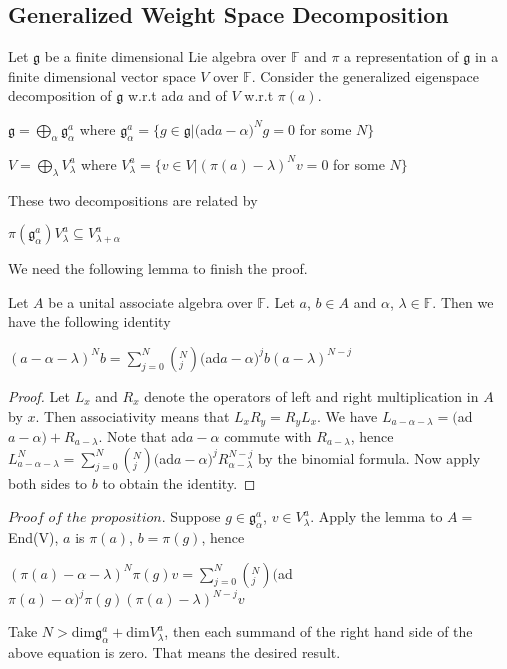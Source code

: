 \documentclass[12pt,a4paper]{article}
\begin{document}
\subsection*{Generalized Weight Space Decomposition}
Let $\mathfrak{g}$ be a finite dimensional Lie algebra over
$\mathbb{F}$ and $\pi$ a representation of $\mathfrak{g}$ in a
finite dimensional vector space $V$ over $\mathbb{F}$. Consider
the generalized eigenspace decomposition of $\mathfrak{g}$ w.r.t
ad$a$ and of $V$ w.r.t $\pi(a)$.
\begin{center}
 $\mathfrak{g}=\bigoplus_{\alpha}\mathfrak{g}_{\alpha}^{a}$ where
 $\mathfrak{g}_{\alpha}^{a}=\{g\in\mathfrak{g}|($ad$a-\alpha)^{N}g=0$
 for some $N\}$
\end{center}
\begin{center}
 $V=\bigoplus_{\lambda}V_{\lambda}^{a}$
 where
 $V_{\lambda}^{a}=\{v \in V|(\pi(a)-\lambda)^{N}v=0$
 for some $N\}$
\end{center}
These two decompositions are related by \\

\begin{proposition}
$\pi(\mathfrak{g}_{\alpha}^{a})V_{\lambda}^{a} \subseteq
V_{\lambda+\alpha}^{a}$
\end{proposition}

\noindent We need the following lemma to finish the proof.\\

\begin{lemma} Let $A$ be a unital associate algebra over $\mathbb{F}$. Let
$a$, $b \in A$ and $\alpha$, $\lambda\in\mathbb{F}$. Then we have
the following identity
\begin{center}
$(a-\alpha-\lambda)^{N}b=\sum_{j=0}^{N}(^{N}_{j})($ad$a-\alpha)^{j}b(a-\lambda)^{N-j}$
\end{center}
\end{lemma}
\begin{proof} Let $L_{x}$ and $R_{x}$ denote the operators of
left and right multiplication in $A$ by $x$. Then associativity
means that $L_{x}R_{y}=R_{y}L_{x}$. We have
$L_{a-\alpha-\lambda}=($ad$a-\alpha)+R_{a-\lambda}$. Note that
ad$a-\alpha$ commute with $R_{a-\lambda}$, hence
$L_{a-\alpha-\lambda}^{N}=\sum_{j=0}^{N}(^{N}_{j})
($ad$a-\alpha)^{j}R_{\alpha-\lambda}^{N-j}$ by the binomial
formula. Now apply both sides to $b$ to obtain the identity.
\end{proof}

\noindent $Proof$ $of$ $the$ $proposition$. Suppose
$g\in\mathfrak{g}_{\alpha}^{a}$, $v\in V_{\lambda}^{a}$. Apply the
lemma to $A=$End(V), $a$ is $\pi(a)$, $b=\pi(g)$, hence
\begin{center}
$(\pi(a)-\alpha-\lambda)^{N}\pi(g)v=\sum_{j=0}^{N}(^{N}_{j})($ad$\pi(a)-\alpha)^{j}\pi(g)(\pi(a)-\lambda)^{N-j}v$
\end{center}
Take $N>$dim$\mathfrak{g}_{\alpha}^{a}+$dim$V_{\lambda}^{a}$, then
each summand of the right hand side of the above equation is zero.
That means the desired result.
\\
\end{document}
